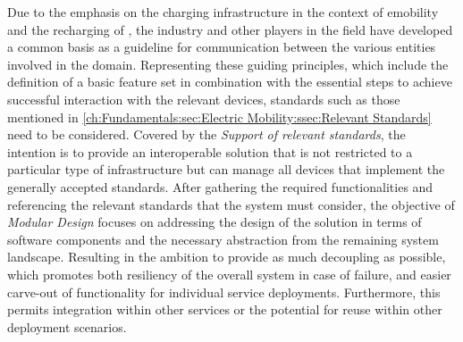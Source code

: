Due to the emphasis on the charging infrastructure in the context of \acrshort{emobility} and the recharging of , the industry and other players in the field have developed a common basis as a guideline for communication between the various entities involved in the domain.
Representing these guiding principles, which include the definition of a basic feature set in combination with the essential steps to achieve successful interaction with the relevant devices, standards such as those mentioned in \ref{ch:Fundamentals:sec:Electric Mobility:ssec:Relevant Standards} need to be considered.
Covered by the \textit{Support of relevant standards}, the intention is to provide an interoperable solution that is not restricted to a particular type of infrastructure but can manage all devices that implement the generally accepted standards.
After gathering the required functionalities and referencing the relevant standards that the system must consider, the objective of \textit{Modular Design} focuses on addressing the design of the solution in terms of software components and the necessary abstraction from the remaining system landscape.
Resulting in the ambition to provide as much decoupling as possible, which promotes both resiliency of the overall system in case of failure, and easier carve-out of functionality for individual service deployments. Furthermore, this permits integration within other services or the potential for reuse within other deployment scenarios. \\

